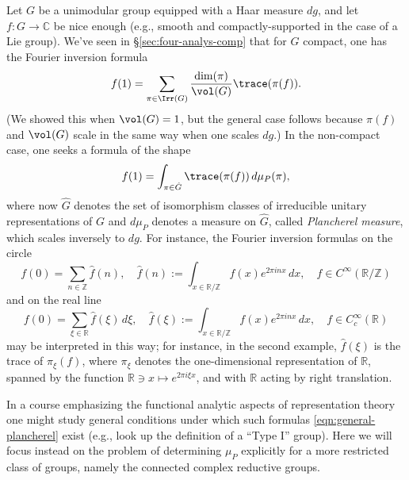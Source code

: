 \documentclass[reqno]{amsart} 
\begin{document}
Let $G$ be a unimodular group equipped with a Haar measure $d g$, and let $f : G \rightarrow \mathbb{C}$ be nice enough (e.g., smooth and compactly-supported in the case of a Lie group).  We've seen in \S\ref{sec:four-analys-comp} that for $G$ compact, one has the Fourier inversion formula
\begin{equation}\label{eqn:}
  f(1)
  =
  \sum_{\pi \in \Irr(G)}
  \frac{\dim(\pi)}{\vol(G)}
  \trace(\pi(f)).
\end{equation}
(We showed this when $\vol(G) = 1$, but the general case follows because $\pi(f)$ and $\vol(G)$ scale in the same way when one scales $d g$.)  In the non-compact case, one seeks a formula of the shape
\begin{equation}\label{eqn:general-plancherel}
  f(1)
  = \int_{\pi \in \hat{G}}
  \trace(\pi(f))
  \, d \mu_P(\pi),
\end{equation}
where now $\hat{G}$ denotes the set of isomorphism classes of irreducible unitary representations of $G$ and $d \mu_P$ denotes a measure on $\hat{G}$, called \emph{Plancherel measure}, which scales inversely to $d g$.  For instance, the Fourier inversion formulas on the circle
\begin{equation}\label{eqn:}
  f(0)
  = \sum_{n \in \mathbb{Z}}
  \hat{f}(n),
  \quad
  \hat{f}(n) := \int_{x \in \mathbb{R}/\mathbb{Z}}
  f(x) e^{2 \pi i n x} \, d x,
  \quad
  f \in C^\infty(\mathbb{R}/\mathbb{Z})
\end{equation}
and on the real line
\begin{equation}\label{eqn:}
  f(0)
  = \sum_{\xi \in \mathbb{R}}
  \hat{f}(\xi)
  \, d \xi,
  \quad
  \hat{f}(\xi) := \int_{x \in \mathbb{R}/\mathbb{Z}}
  f(x) e^{2 \pi i n x} \, d x,
  \quad
  f \in C_c^\infty(\mathbb{R})
\end{equation}
may be interpreted in this way; for instance, in the second example, $\hat{f}(\xi)$ is the trace of $\pi_\xi(f)$, where $\pi_\xi$ denotes the one-dimensional representation of $\mathbb{R}$, spanned by the function $\mathbb{R} \ni x \mapsto e^{2 \pi i \xi x}$, and with $\mathbb{R}$ acting by right translation.

In a course emphasizing the functional analytic aspects of representation theory one might study general conditions under which such formulas \eqref{eqn:general-plancherel} exist (e.g., look up the definition of a ``Type I'' group).  Here we will focus instead on the problem of determining $\mu_P$ explicitly for a more restricted class of groups, namely the connected complex reductive groups.
\end{document}
